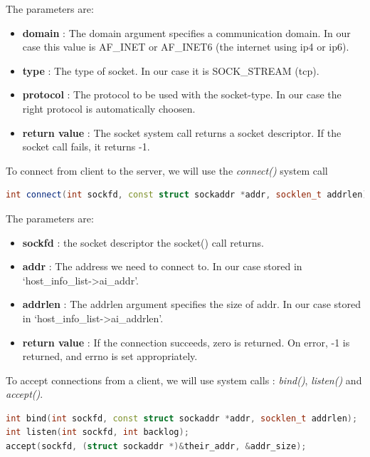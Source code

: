 \documentclass{article}
\begin{document}
				The parameters are:

				\begin{itemize}
				\item \textbf{domain} : The domain argument specifies a communication domain. In our case this value is AF\_INET or AF\_INET6 (the internet using ip4 or ip6). 
				\item \textbf{type} : The type of socket. In our case it is SOCK\_STREAM (tcp). 
				\item \textbf{protocol} : The protocol to be used with the socket-type. In our case the right protocol is automatically choosen. 
				\item \textbf{return value} : The socket system call returns a socket descriptor. If the socket call fails, it returns -1. 
				\end{itemize}

				To connect from client to the server, we will use the \textit{connect()} system call

				\begin{lstlisting}[language=C++, caption={connect() function}]
int connect(int sockfd, const struct sockaddr *addr, socklen_t addrlen); 
				\end{lstlisting} 	

				The parameters are:

				\begin{itemize}
				\item \textbf{sockfd} : the socket descriptor the socket() call returns. 
				\item \textbf{addr} : The address we need to connect to. In our case stored in `host\_info\_list->ai\_addr'. 
				\item \textbf{addrlen} : The addrlen argument specifies the size of addr. In our case stored in `host\_info\_list->ai\_addrlen'. 
				\item \textbf{return value} : If the connection succeeds, zero is returned. On error, -1 is returned, and errno is set appropriately.
				\end{itemize}

				To accept connections from a client, we will use system calls : \textit{bind()}, \textit{listen()} and \textit{accept()}.

				\begin{lstlisting}[language=C++, caption={bind(), listen() and accept() function}]
int bind(int sockfd, const struct sockaddr *addr, socklen_t addrlen); 
int listen(int sockfd, int backlog);
accept(sockfd, (struct sockaddr *)&their_addr, &addr_size); 
				\end{lstlisting}				 
\end{document}
